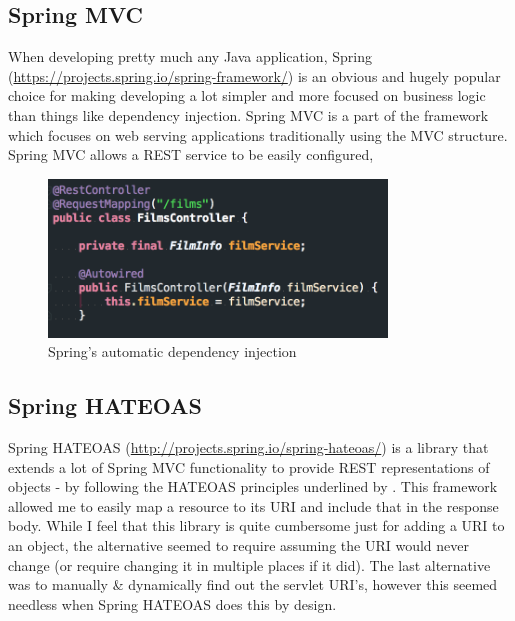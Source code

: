 \documentclass[12pt]{article}
\begin{document}
  \subsection{Spring MVC}
    When developing pretty much any Java application, Spring (\url{https://projects.spring.io/spring-framework/}) is an obvious and hugely popular choice for making developing a lot simpler and more focused on business logic than things like dependency injection. Spring MVC is a part of the framework which focuses on web serving applications traditionally using the MVC structure. Spring MVC allows a REST \citep{fielding2000architectural} service to be easily configured,

    \begin{figure}[ht]
      \centering
      \includegraphics[width=9cm]{autowired-components}
      \caption{Spring's automatic dependency injection}
      \label{fig:spring-autowired-components}
    \end{figure}

  \subsection{Spring HATEOAS}
    Spring HATEOAS (\url{http://projects.spring.io/spring-hateoas/}) is a library that extends a lot of Spring MVC functionality to provide REST representations of objects - by following the HATEOAS principles underlined by \cite{fielding2000architectural}. This framework allowed me to easily map a resource to its URI and include that in the response body. While I feel that this library is quite cumbersome just for adding a URI to an object, the alternative seemed to require assuming the URI would never change (or require changing it in multiple places if it did). The last alternative was to manually \& dynamically find out the servlet URI's, however this seemed needless when Spring HATEOAS does this by design.
\end{document}
